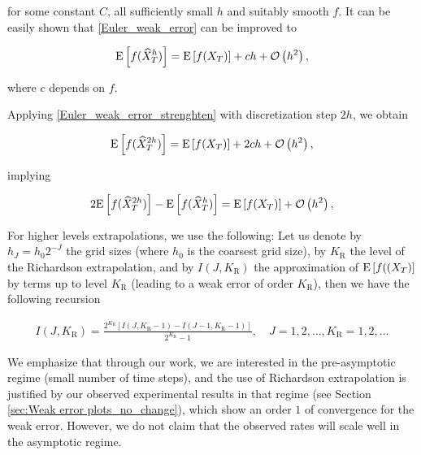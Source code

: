 for some constant $C$, all sufficiently small $h$ and suitably smooth $f$. It can be easily  shown that  \eqref{Euler_weak_error} can be improved to


\begin{align}\label{Euler_weak_error_strenghten}
	\mathrm{E}\left[f(\widehat{X}_T^h)\right]= \mathrm{E}\left[f(X_T)\right] + c h +{\mathcal{O}}\left(h^2\right) ,
\end{align}


where $c$ depends on $f$. 

Applying \eqref{Euler_weak_error_strenghten} with discretization step $2h$, we  obtain

\begin{align}\label{Euler_weak_error_strenghten_2h}
	\mathrm{E}\left[f(\widehat{X}_T^{2h})\right]= \mathrm{E}\left[f(X_T)\right] + 2 c h +{\mathcal{O}}\left(h^2\right) ,
\end{align}

implying

\begin{align}\label{Richardson_extrapol}
	2 \mathrm{E}\left[f(\widehat{X}_T^{2h})\right]- \mathrm{E}\left[f(\widehat{X}_T^{h})\right] =\mathrm{E}\left[f(X_T)\right] + {\mathcal{O}}\left(h^2\right) ,
\end{align}

For higher levels extrapolations, we use the following: Let us denote by $h_J=h_0 2^{-J}$ the grid sizes (where $h_0$ is the coarsest grid size), by $K_\text{R}$ the level of the Richardson extrapolation, and by $I(J,K_\text{R})$ the approximation of $\mathrm{E}\left[f((X_T)\right]$ by terms up to level $K_\text{R}$ (leading to a weak error of order $K_\text{R}$), then we have the following recursion 

\begin{align}
I(J,K_\text{R})=\frac{2^{K_\text{R}}\left[I(J,K_\text{R}-1)-I(J-1,K_\text{R}-1)\right]}{2^{K_\text{R}}-1},\quad J=1,2,\dots, K_\text{R}=1,2,\dots
\end{align}



\begin{remark}
We emphasize that through our work, we are interested in the pre-asymptotic regime (small number of time steps), and the use of Richardson extrapolation is justified by our observed experimental results in that regime (see Section \ref{sec:Weak error plots_no_change}),  which show an order $1$ of convergence for the weak error. However, we do not claim that the observed rates will scale well in the asymptotic regime. 
\end{remark}



